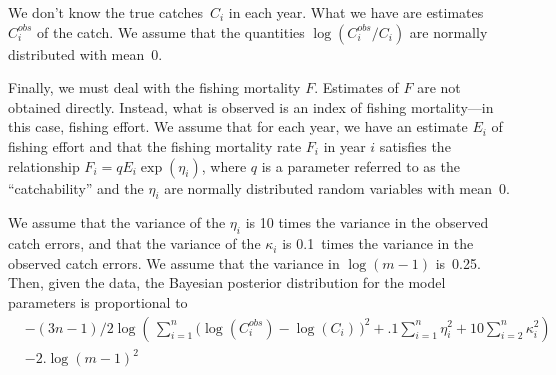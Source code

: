 \documentclass{admbmanual}
\newcommand{\cobs}{C^{obs}_i}
\begin{document}
We don't know the true catches~$C_i$ in each year. What we have are estimates
$\cobs$ of the catch. We assume that the quantities $\log(\cobs/C_i)$ are
normally distributed with mean~0.

Finally, we must deal with the fishing mortality $F$. Estimates of $F$ are not
obtained directly. Instead, what is observed is an index of fishing
mortality---in this case, fishing effort. We assume that for each year, we have
an estimate $E_i$ of fishing effort and that the fishing mortality rate $F_i$ in
year $i$ satisfies the relationship $F_i=qE_i\exp(\eta_i)$, where $q$ is a
parameter referred to as the ``catchability'' and the $\eta_i$ are normally
distributed random variables with mean~0.

We assume that the variance of the $\eta_i$ is 10 times the variance in the
observed catch errors, and that the variance of the $\kappa_i$ is 0.1~times the
variance in the observed catch errors. We assume that the variance in
$\log(m-1)$ is~0.25. Then, given the data, the Bayesian posterior distribution
for the model parameters is proportional to
\begin{align}
  \nonumber &-(3n-1)/
  2\log\left(\,\sum_{i=1}^n \big(\log(\cobs)-\log(C_i)\,\big)^2
      +.1\sum_{i=1}^n\eta_i^2  +10\sum_{i=2}^n\kappa_i^2\right)\\
   &-2.\log(m-1)^2
  \label{ch1:xx7}
\end{align}
\end{document}
